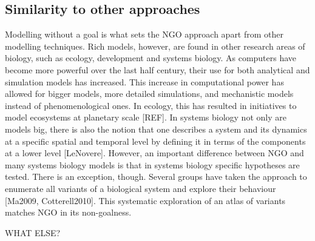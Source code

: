 \subsection{Similarity to other approaches}

Modelling without a goal is what sets the NGO approach apart from other modelling techniques. Rich models, however, are found in other research areas of biology, such as ecology, development and systems biology. As computers have become more powerful over the last half century, their use for both analytical and simulation models has increased. This increase in computational power has allowed for bigger models, more detailed simulations, and mechanistic models instead of phenomenological ones. In ecology, this has resulted in initiatives to model ecosystems at planetary scale [REF]. In systems biology not only are models big, there is also the notion that one describes a system and its dynamics at a specific spatial and temporal level by defining it in terms of the components at a lower level [LeNovere]. However, an important difference between NGO and many systems biology models is that in systems biology specific hypotheses are tested. There is an exception, though. Several groups have taken the approach to enumerate all variants of a biological system and explore their behaviour [Ma2009, Cotterell2010]. This systematic exploration of an atlas of variants matches NGO in its non-goalness.

WHAT ELSE?